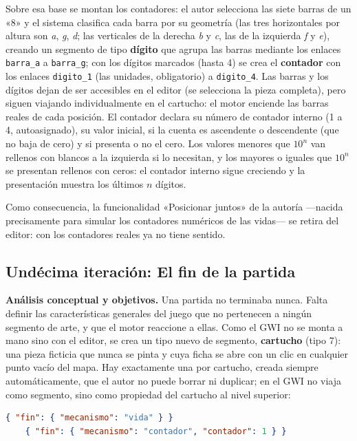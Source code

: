 Sobre esa base se montan los contadores: el autor selecciona las siete
barras de un «8» y el sistema clasifica cada barra por su geometría
(las tres horizontales por altura son \emph{a}, \emph{g}, \emph{d}; las
verticales de la derecha \emph{b} y \emph{c}, las de la izquierda
\emph{f} y \emph{e}), creando un segmento de tipo \textbf{dígito} que
agrupa las barras mediante los enlaces \texttt{barra\_a} a
\texttt{barra\_g}; con los dígitos marcados (hasta 4) se crea el
\textbf{contador} con los enlaces \texttt{digito\_1} (las unidades,
obligatorio) a \texttt{digito\_4}. Las barras y los dígitos dejan de ser
accesibles en el editor (se selecciona la pieza completa), pero siguen
viajando individualmente en el cartucho: el motor enciende las barras
reales de cada posición. El contador declara su número de contador
interno (1 a 4, autoasignado), su valor inicial, si la cuenta es
ascendente o descendente (que no baja de cero) y si presenta o no el
cero. Los valores menores que $10^n$ van rellenos con blancos a la
izquierda si lo necesitan, y los mayores o iguales que $10^n$ se
presentan rellenos con ceros: el contador interno sigue creciendo y la
presentación muestra los últimos $n$ dígitos.

Como consecuencia, la funcionalidad «Posicionar juntos» de la autoría
—nacida precisamente para simular los contadores numéricos de las
vidas— se retira del editor: con los contadores reales ya no tiene
sentido.

\subsection{Undécima iteración: El fin de la partida}
\label{sec:F3Fin}

\textbf{Análisis conceptual y objetivos.} Una partida no terminaba
nunca. Falta definir las características generales del juego que no
pertenecen a ningún segmento de arte, y que el motor reaccione a ellas.
Como el GWI no se monta a mano sino con el editor, se crea un tipo nuevo
de segmento, \textbf{cartucho} (tipo 7): una pieza ficticia que nunca
se pinta y cuya ficha se abre con un clic en cualquier punto vacío del
mapa. Hay exactamente una por cartucho, creada siempre automáticamente,
que el autor no puede borrar ni duplicar; en el GWI no viaja como
segmento, sino como propiedad del cartucho al nivel superior:

\begin{lstlisting}[language=json]
	{ "fin": { "mecanismo": "vida" } }
	{ "fin": { "mecanismo": "contador", "contador": 1 } }
\end{lstlisting}

